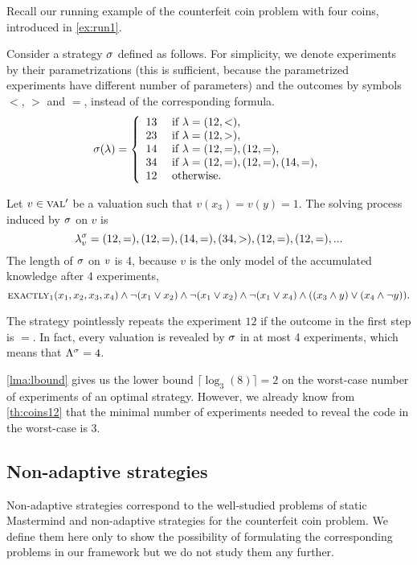 \begin{example} \label{ex:run2}
Recall our running example of the counterfeit coin problem with four coins,
introduced in \autoref{ex:run1}.

Consider a strategy $\sigma$ defined as follows.
For simplicity, we denote experiments by their parametrizations
  (this is sufficient, because the parametrized experiments have different number of parameters)
  and the outcomes by symbols $<$, $>$ and $=$,
  instead of the corresponding formula.
\[
\sigma(\lambda) = \left\{\begin{array}{ll}
13 & \textrm{ if } \lambda = (12, <), \\
23 & \textrm{ if } \lambda = (12, >),\\
14 & \textrm{ if } \lambda = (12, =), (12, =), \\
34 & \textrm{ if } \lambda = (12, =), (12, =), (14, =), \\
12 & \textrm{ otherwise.}
\end{array}\right.
\]

Let $v\in\textsc{val}'$ be a valuation such that $v(x_3) = v(y) = 1$.
The solving process induced by $\sigma$ on $v$ is
\[
\lambda^{\sigma}_{v} = (12, =), (12, =), (14, =), (34, >), (12, =), (12, =), ...
\]
The length of $\sigma$ on $v$ is 4, because $v$ is the only model of
  the accumulated knowledge after 4 experiments,
\[
\textsc{exactly}_1(x_1,x_2,x_3,x_4) \wedge \neg(x_1 \vee x_2) \wedge \neg(x_1 \vee x_2)
\wedge \neg(x_1 \vee x_4) \wedge ((x_3 \wedge y) \vee (x_4 \wedge \neg y)).
\]

The strategy pointlessly repeats the experiment $12$
  if the outcome in the first step is $=$.
In fact, every valuation is revealed by $\sigma$ in at most 4 experiments,
  which means that $\Lambda^{\sigma} = 4$.

\autoref{lma:lbound} gives us the lower bound $ \lceil\log_3(8)\rceil = 2$
 on the worst-case number of experiments of an optimal strategy.
However, we already know from \autoref{th:coins12} that the minimal number
  of experiments needed to reveal the code in the worst-case is 3. \eqed
\end{example}

\subsection{Non-adaptive strategies}

Non-adaptive strategies correspond to the well-studied problems of
  static Mastermind and
  non-adaptive strategies for
  the counterfeit coin problem\cite{mm-static}\cite{coins-nonadaptive}.
We define them here only to show the possibility of formulating the
  corresponding problems
  in our framework but we do not study them any further.

